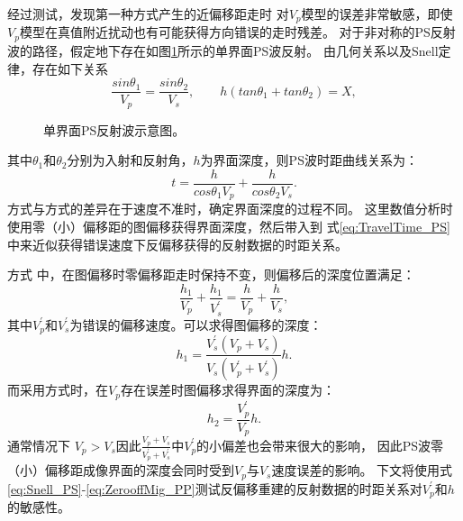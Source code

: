 经过测试，发现第一种方式产生的近偏移距走时
对$V_p$模型的误差非常敏感，即使$V_p$模型在真值附近扰动也有可能获得方向错误的走时残差。
对于非对称的PS反射波的路径，假定地下存在如图\ref{fig:PS_refl}所示的单界面PS波反射。
由几何关系以及Snell定律，存在如下关系
\begin{equation}
    \frac{sin\theta_1}{V_p}=\frac{sin\theta_2}{V_s},\qquad
    h(tan\theta_1+tan\theta_2)=X,
    \label{eq:Snell_PS} 
\end{equation}
\begin{figure}
   \centering
   \caption{单界面PS反射波示意图。}
   \label{fig:PS_refl}
\end{figure}
其中$\theta_1$和$\theta_2$分别为入射和反射角，$h$为界面深度，则PS波时距曲线关系为：
\begin{equation}
	t=\frac{h}{cos\theta_1V_p}+\frac{h}{cos\theta_2V_s}.
    \label{eq:TravelTime_PS} 
\end{equation}
方式\uppercase\expandafter{}与方式\uppercase\expandafter{}的差异在于速度不准时，确定界面深度的过程不同。
这里数值分析时使用零（小）偏移距的图偏移获得界面深度，然后带入到
式\eqref{eq:TravelTime_PS}中来近似获得错误速度下反偏移获得的反射数据的时距关系。

方式\uppercase\expandafter{}
中，在图偏移时零偏移距走时保持不变，则偏移后的深度位置满足：
\begin{equation}
	\frac{h_{1}}{V_p}+\frac{h_{1}}{V^{'}_s}=\frac{h}{V_p}+\frac{h}{V_s},
    \label{eq:Mapmigration_PS} 
\end{equation}
其中$V^{'}_p$和$V^{'}_s$为错误的偏移速度。可以求得图偏移的深度：
\begin{equation}
	{h_{1}}=\frac{V^{'}_s(V_p+V_s)}{V_s(V^{'}_p+V^{'}_s)}h.
    \label{eq:ZerooffMig_PS} 
\end{equation}
而采用方式\uppercase\expandafter{}时，在$V_p$存在误差时图偏移求得界面的深度为：
\begin{equation}
	{h_{2}}=\frac{V^{'}_p}{V_p}h.
    \label{eq:ZerooffMig_PP} 
\end{equation}
通常情况下
$V_p>V_s$因此$\frac{V_p+V_s}{V^{'}_p+V^{'}_s}$中$V^{'}_p$的小偏差也会带来很大的影响，
因此PS波零（小）偏移距成像界面的深度会同时受到$V_p$与$V_s$速度误差的影响。
下文将使用式\eqref{eq:Snell_PS}-\eqref{eq:ZerooffMig_PP}测试反偏移重建的反射数据的时距关系对$V^{'}_p$和$h$的敏感性。

